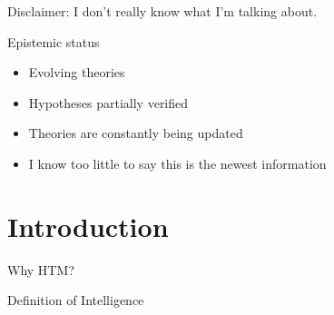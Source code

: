
\begin{frame}[standout]
    Disclaimer: \pause I don't really know what I'm talking about.
\end{frame}

\begin{frame}[c]{Epistemic status}
    \Large
    \begin{itemize}[<+(1)->]
        \item Evolving theories
        \item Hypotheses partially verified
        \item Theories are constantly being updated
        \item I know too little to say this is the newest information
    \end{itemize}
\end{frame}

\section{Introduction}


\begin{frame}[c]{Why HTM?}
    
\end{frame}


\begin{frame}[c]{Definition of Intelligence}
    
\end{frame}


% 




%








